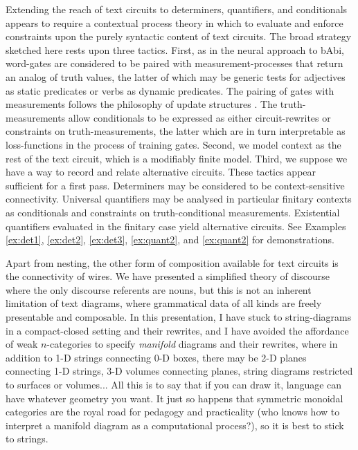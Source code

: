  Extending the reach of text circuits to determiners, quantifiers, and conditionals appears to require a contextual process theory in which to evaluate and enforce constraints upon the purely syntactic content of text circuits. The broad strategy sketched here rests upon three tactics. First, as in the neural approach to bAbi, word-gates are considered to be paired with measurement-processes that return an analog of truth values, the latter of which may be generic tests for adjectives as static predicates or verbs as dynamic predicates. The pairing of gates with measurements follows the philosophy of update structures \citep{hefford_categories_2020}. The truth-measurements allow conditionals to be expressed as either circuit-rewrites or constraints on truth-measurements, the latter which are in turn interpretable as loss-functions in the process of training gates. Second, we model context as the rest of the text circuit, which is a modifiably finite model. Third, we suppose we have a way to record and relate alternative circuits. These tactics appear sufficient for a first pass. Determiners may be considered to be context-sensitive connectivity. Universal quantifiers may be analysed in particular finitary contexts as conditionals and constraints on truth-conditional measurements. Existential quantifiers evaluated in the finitary case yield alternative circuits. See Examples \ref{ex:det1}, \ref{ex:det2}, \ref{ex:det3}, \ref{ex:quant2}, and \ref{ex:quant2} for demonstrations.

 Apart from nesting, the other form of composition available for text circuits is the connectivity of wires. We have presented a simplified theory of discourse where the only discourse referents are nouns, but this is not an inherent limitation of text diagrams, where grammatical data of all kinds are freely presentable and composable. In this presentation, I have stuck to string-diagrams in a compact-closed setting and their rewrites, and I have avoided the affordance of weak $n$-categories to specify \emph{manifold} diagrams and their rewrites, where in addition to 1-D strings connecting 0-D boxes, there may be 2-D planes connecting 1-D strings, 3-D volumes connecting planes, string diagrams restricted to surfaces or volumes... All this is to say that if you can draw it, language can have whatever geometry you want. It just so happens that symmetric monoidal categories are the royal road for pedagogy and practicality (who knows how to interpret a manifold diagram as a computational process?), so it is best to stick to strings.

